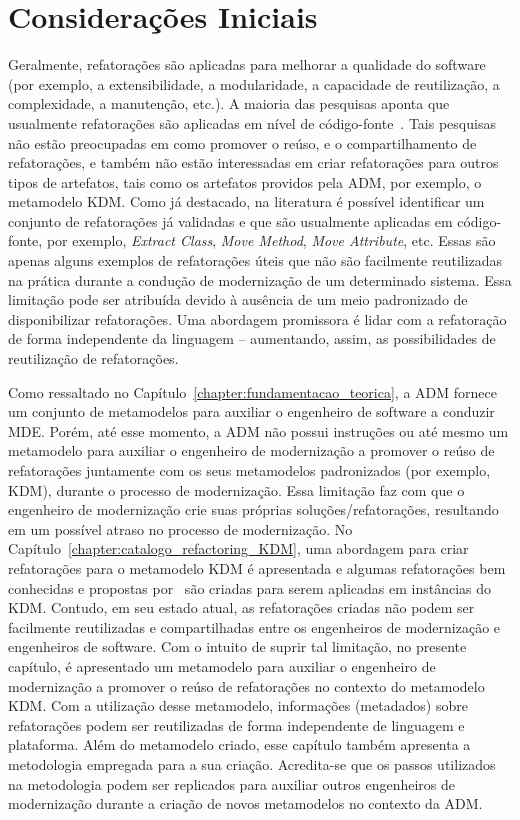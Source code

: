 \section{Considerações Iniciais}\label{sec:consideracoes_iniciais}
Geralmente, refatorações são aplicadas para melhorar a qualidade do software (por exemplo, a extensibilidade, a modularidade, a capacidade de reutilização, a complexidade, a manutenção, etc.). 
A maioria das pesquisas aponta que usualmente refatorações são aplicadas em nível de código-fonte~\cite{Fowler1999, Demeyer1, Demeyer2, OPDYKE_1992}. Tais pesquisas não estão preocupadas em como promover o reúso, e o compartilhamento de refatorações, e também não estão interessadas em criar refatorações para outros tipos de artefatos, tais como os artefatos providos pela ADM, por exemplo, o metamodelo KDM. 
%
Como já destacado, na literatura é possível identificar um conjunto de refatorações já validadas e que são usualmente aplicadas em código-fonte, por exemplo, \textit{Extract Class}, \textit{Move Method}, \textit{Move Attribute}, etc. Essas são apenas alguns exemplos de refatorações úteis que não são facilmente reutilizadas na prática durante a condução de modernização de um determinado sistema. Essa limitação pode ser atribuída devido à ausência de um meio padronizado de disponibilizar refatorações. 
Uma abordagem promissora é lidar com a refatoração de forma independente da linguagem – aumentando, assim, as possibilidades de reutilização de refatorações.

Como ressaltado no Capítulo~\ref{chapter:fundamentacao_teorica}, a ADM fornece um conjunto de metamodelos para auxiliar o engenheiro de software a conduzir MDE. 
Porém, até esse momento, a ADM não possui instruções ou até mesmo um metamodelo para auxiliar o engenheiro de modernização a promover o reúso de refatorações juntamente com os seus metamodelos padronizados (por exemplo, KDM), durante o processo de modernização. 
Essa limitação faz com que o engenheiro de modernização crie suas próprias soluções/refatorações, resultando em um possível atraso no processo de modernização. 
No Capítulo~\ref{chapter:catalogo_refactoring_KDM}, uma abordagem para criar refatorações para o metamodelo KDM é apresentada e algumas refatorações bem conhecidas e propostas por~ são criadas para serem aplicadas em instâncias do KDM. Contudo, em seu estado atual, as refatorações criadas não podem ser facilmente reutilizadas e compartilhadas entre os engenheiros de modernização e engenheiros de software. 
Com o intuito de suprir tal limitação, no presente capítulo, é apresentado um metamodelo para auxiliar o engenheiro de modernização a promover o reúso de refatorações no contexto do metamodelo KDM. Com a utilização desse metamodelo, informações (metadados) sobre refatorações podem ser reutilizadas de forma independente de linguagem e plataforma. Além do metamodelo criado, esse capítulo também apresenta a metodologia empregada para a sua criação. Acredita-se que os passos utilizados na metodologia podem ser replicados para auxiliar outros engenheiros de modernização durante a criação de novos metamodelos no contexto da ADM.

